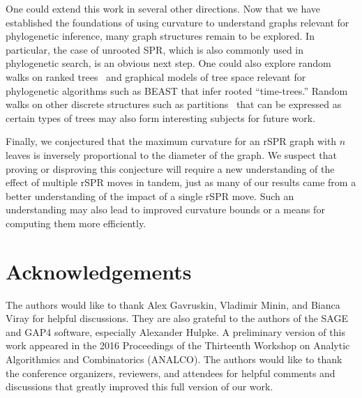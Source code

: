 \documentclass[]{elsarticle}
\begin{document}
One could extend this work in several other directions.
Now that we have established the foundations of using curvature to understand graphs relevant for phylogenetic inference, many graph structures remain to be explored.
In particular, the case of unrooted SPR, which is also commonly used in phylogenetic search, is an obvious next step.
One could also explore random walks on ranked trees~\citep{Song2006-xe} and graphical models of tree space relevant for phylogenetic algorithms such as BEAST \citep{Drummond2012-ek} that infer rooted ``time-trees.''
Random walks on other discrete structures such as partitions~\citep{Gusfield2002-il} that can be expressed as certain types of trees may also form interesting subjects for future work.

Finally, we conjectured that the maximum curvature for an rSPR graph with $n$ leaves is inversely proportional to the diameter of the graph.
We suspect that proving or disproving this conjecture will require a new understanding of the effect of multiple rSPR moves in tandem, just as many of our results came from a better understanding of the impact of a single rSPR move.
Such an understanding may also lead to improved curvature bounds or a means for computing them more efficiently.


\section{Acknowledgements}
The authors would like to thank Alex Gavruskin, Vladimir Minin, and Bianca Viray for helpful discussions.
They are also grateful to the authors of the SAGE and GAP4 software, especially Alexander Hulpke.
A preliminary version of this work appeared in the 2016 Proceedings of the Thirteenth Workshop on Analytic Algorithmics and Combinatorics (ANALCO).
The authors would like to thank the conference organizers, reviewers, and attendees for helpful comments and discussions that greatly improved this full version of our work.



\end{document}
